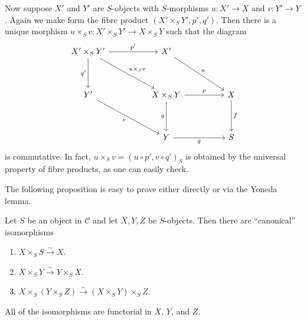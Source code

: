 \documentclass[12pt]{book}
\theoremstyle{definition}
\begin{document}
	Now suppose $X'$ and $Y'$ are $S$-objects with $S$-morphisms $u \colon X' \to X$ and $v \colon Y' \to Y$. Again we make form the fibre product $(X'\times_S Y', p', q')$. Then there is a unique morphism $u \times_S v \colon X' \times_S Y' \to X \times_S Y$ such that the diagram
	\[\begin{tikzcd}
		{X' \times_S Y'} && {X'} && \\
		\\
		{Y'} && {X \times_S Y} && X \\
		\\
		&& Y && S
		\arrow["{p'}", from=1-1, to=1-3]
		\arrow["{q'}"', from=1-1, to=3-1]
		\arrow["u \times_S v", from=1-1, to=3-3]
		\arrow["u", from=1-3, to=3-5]
		\arrow["v"', from=3-1, to=5-3]
		\arrow["p", from=3-3, to=3-5]
		\arrow["q"', from=3-3, to=5-3]
		\arrow["f", from=3-5, to=5-5]
		\arrow["g"', from=5-3, to=5-5]
	\end{tikzcd}\]
	is commutative. In fact, $u \times_S v = (u \circ p', v \circ q')_S$ is obtained by the universal property of fibre products, as one can easily check. 
	
	The following proposition is easy to prove either directly or via the Yoneda lemma.
	
	\begin{proposition}
		Let $S$ be an object in $\mathcal{C}$ and let $X, Y, Z$  be $S$-objects. Then there are ``canonical'' isomorphisms
		\begin{enumerate}
			\item $X \times_S S \xrightarrow{\sim} X$.
			\item $X \times_S Y \xrightarrow{\sim} Y \times_S X$.
			\item $X \times_S (Y \times_S Z) \xrightarrow{\sim} (X \times_S Y) \times_S Z$.
		\end{enumerate}
		All of the isomorphisms are functorial in $X$, $Y$, and $Z$.
	\end{proposition}
	
\end{document}
